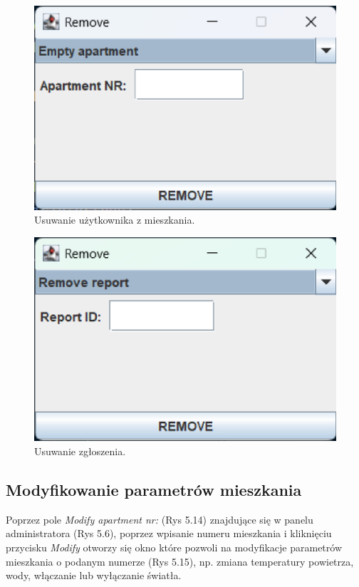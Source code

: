 \begin{figure}[H]
    \centering
    \includegraphics[width=\textwidth,height=0.15\textheight,keepaspectratio]{figures/app-images/Remove/empty-apartment.eps}
    \caption{Usuwanie użytkownika z mieszkania.\label{fig17}}
\end{figure}

\begin{figure}[H]
    \centering
    \includegraphics[width=\textwidth,height=0.15\textheight,keepaspectratio]{figures/app-images/Remove/remove-report.eps}
    \caption{Usuwanie zgłoszenia.\label{fig18}}
\end{figure}

\newpage
\subsection{Modyfikowanie parametrów mieszkania}
Poprzez pole \textit{Modify apartment nr:} (Rys 5.14) znajdujące się w panelu administratora (Rys 5.6), poprzez wpisanie numeru mieszkania 
i kliknięciu przycisku \textit{Modify} otworzy się okno które pozwoli na modyfikacje parametrów mieszkania o podanym numerze (Rys 5.15),
np. zmiana temperatury powietrza, wody, włączanie lub wyłączanie światła.

